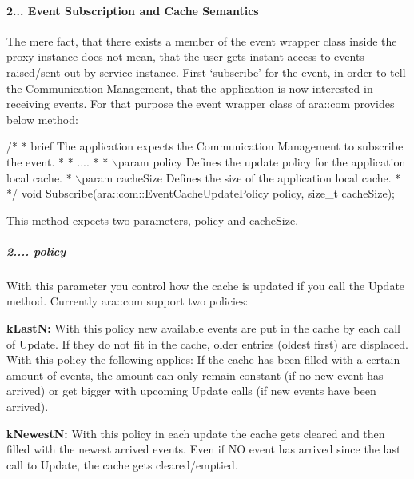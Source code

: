  \paragraph*{2... Event Subscription and Cache Semantics}


\begin{DoxyItemize}
\item The mere fact, that there exists a member of the event wrapper class inside the proxy instance does not mean, that the user gets instant access to events raised/sent out by service instance. First ‘subscribe’ for the event, in order to tell the Communication Management, that the application is now interested in receiving events. For that purpose the event wrapper class of ara\+::com provides below method\+:
\end{DoxyItemize}


\begin{DoxyCode}
\textcolor{comment}{/*}
\textcolor{comment}{ * brief The application expects the Communication Management to}
\textcolor{comment}{    subscribe the event.}
\textcolor{comment}{ *}
\textcolor{comment}{ * ....}
\textcolor{comment}{ *}
\textcolor{comment}{ * \(\backslash\)param policy Defines the update policy for the application local}
\textcolor{comment}{   cache.}
\textcolor{comment}{ * \(\backslash\)param cacheSize Defines the size of the application local cache.}
\textcolor{comment}{ *}
\textcolor{comment}{ */}
  \textcolor{keywordtype}{void} Subscribe(ara::com::EventCacheUpdatePolicy policy, \textcolor{keywordtype}{size\_t} cacheSize);
\end{DoxyCode}

\begin{DoxyItemize}
\item This method expects two parameters, policy and cache\+Size.
\end{DoxyItemize}

\subparagraph*{2.... policy}


\begin{DoxyItemize}
\item With this parameter you control how the cache is updated if you call the Update method. Currently ara\+::com support two policies\+:
\item {\bfseries k\+LastN\+:} With this policy new available events are put in the cache by each call of Update. If they do not fit in the cache, older entries (oldest first) are displaced. With this policy the following applies\+: If the cache has been filled with a certain amount of events, the amount can only remain constant (if no new event has arrived) or get bigger with upcoming Update calls (if new events have been arrived).
\item {\bfseries k\+NewestN\+:} With this policy in each update the cache gets cleared and then filled with the newest arrived events. Even if NO event has arrived since the last call to Update, the cache gets cleared/emptied.
\end{DoxyItemize}

